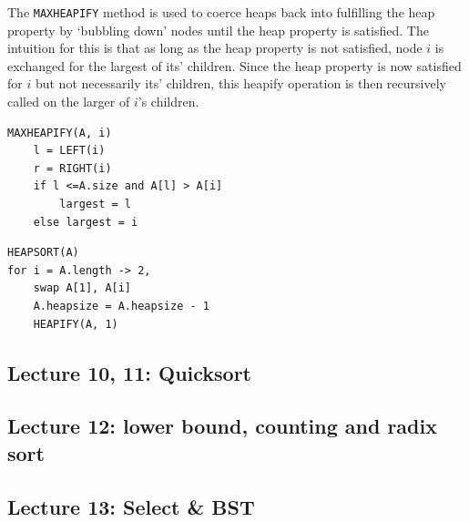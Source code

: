 \documentclass[../notes.tex]{subfiles}
\begin{document}
The \texttt{MAXHEAPIFY} method is used to coerce heaps back into fulfilling the heap property by `bubbling down' nodes until the heap property is satisfied.
The intuition for this is that as long as the heap property is not satisfied, node $ i $ is exchanged for the largest of its' children. Since the heap property is now satisfied for $ i $ but not necessarily its' children, this heapify operation is then recursively called on the larger of $ i $'s children.

\begin{listing}[H]
\begin{verbatim}
MAXHEAPIFY(A, i)
	l = LEFT(i)
	r = RIGHT(i)
	if l <=A.size and A[l] > A[i]
		largest = l
	else largest = i

\end{verbatim}
\end{listing}





\begin{listing}[H]
\begin{verbatim}
HEAPSORT(A)
for i = A.length -> 2,
	swap A[1], A[i]
	A.heapsize = A.heapsize - 1
	HEAPIFY(A, 1)
\end{verbatim}
\end{listing}




\subsection{Lecture 10, 11: Quicksort}
\subsection{Lecture 12: lower bound, counting and radix sort}
\subsection{Lecture 13: Select \& BST}




\end{document}

